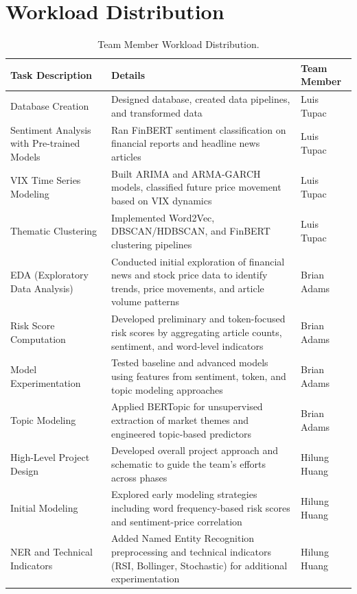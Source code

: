 \documentclass[twocolumn]{article}
\begin{document}
\section{Workload Distribution}
\begin{table}[h!]
\centering
\small
\begin{tabular}{|p{4cm}|p{6cm}|p{3cm}|}
\hline
\textbf{Task Description} & \textbf{Details} & \textbf{Team Member} \\
\hline
Database Creation & Designed database, created data pipelines, and transformed data & Luis Tupac \\
\hline
Sentiment Analysis with Pre-trained Models & Ran FinBERT sentiment classification on financial reports and headline news articles & Luis Tupac \\
\hline
VIX Time Series Modeling & Built ARIMA and ARMA-GARCH models, classified future price movement based on VIX dynamics & Luis Tupac \\
\hline
Thematic Clustering & Implemented Word2Vec, DBSCAN/HDBSCAN, and FinBERT clustering pipelines & Luis Tupac \\
\hline
EDA (Exploratory Data Analysis) & Conducted initial exploration of financial news and stock price data to identify trends, price movements, and article volume patterns & Brian Adams \\
\hline
Risk Score Computation & Developed preliminary and token-focused risk scores by aggregating article counts, sentiment, and word-level indicators & Brian Adams \\
\hline
Model Experimentation & Tested baseline and advanced models using features from sentiment, token, and topic modeling approaches & Brian Adams \\
\hline
Topic Modeling & Applied BERTopic for unsupervised extraction of market themes and engineered topic-based predictors & Brian Adams \\
\hline
High-Level Project Design & Developed overall project approach and schematic to guide the team’s efforts across phases & Hilung Huang \\
\hline
Initial Modeling & Explored early modeling strategies including word frequency-based risk scores and sentiment-price correlation & Hilung Huang \\
\hline
NER and Technical Indicators & Added Named Entity Recognition preprocessing and technical indicators (RSI, Bollinger, Stochastic) for additional experimentation & Hilung Huang \\
\hline
\end{tabular}
\caption{Team Member Workload Distribution.}
\label{tab:workload-distribution}
\end{table}

\twocolumn[
\begin{@twocolumnfalse}
\begingroup
\raggedright
\sloppy


\endgroup
\end{@twocolumnfalse}
]
\end{document}
